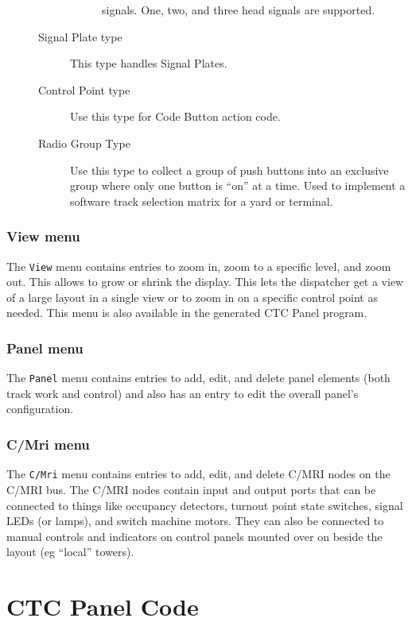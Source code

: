 \begin{description}
\begin{description}
\begin{description}
signals.  One, two, and three head signals are supported.
	\end{description}
      \item[Signal Plate type] This type handles Signal Plates.
      \item[Control Point type] Use this type for Code Button action code.
      \item[Radio Group Type] Use this type to collect a group of push 
buttons into an exclusive group where only one button is ``on'' at a
time.  Used to implement a software track selection matrix for a yard or
terminal.
    \end{description}
\end{description}

\subsubsection{View menu}

The \verb=View= menu contains entries to zoom in, zoom to a specific
level, and zoom out. This allows to grow or shrink the display.  This
lets the dispatcher get a view of a large layout in a single view or to
zoom in on a specific control point as needed.  This menu is also
available in the generated CTC Panel program.

\subsubsection{Panel menu}

The \verb=Panel= menu contains entries to add, edit, and delete panel
elements (both track work and control) and also has an entry to edit the
overall panel's configuration. 

\subsubsection{C/Mri menu}

The \verb=C/Mri= menu contains entries to add, edit, and delete C/MRI
nodes on the C/MRI bus. The C/MRI nodes contain input and output ports
that can be connected to things like occupancy detectors, turnout point
state switches, signal LEDs (or lamps), and switch machine motors.  They
can also be connected to manual controls and indicators on control
panels mounted over on beside the layout (eg ``local'' towers).


\section{CTC Panel Code}

